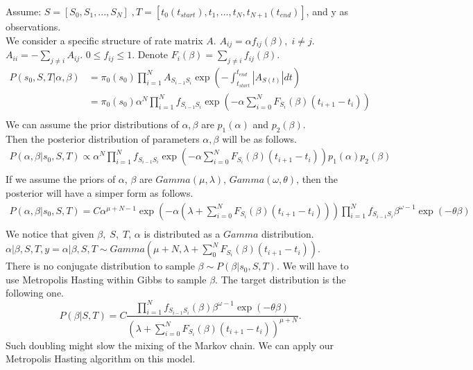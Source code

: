 \noindent Assume: $S = [S_0,S_1, ...,S_N] \;, T = [t_0(t_{start}), t_1,...,t_N, t_{N+1}(t_{end})]$, and y as observations.\\
We consider a specific structure of rate matrix $A$. $A_{ij} = \alpha f_{ij}(\beta), \; i \neq j$. $A_{ii} = -\sum_{j \neq i} A_{ij}$. $0 \leq f_{ij} \leq 1$. Denote $F_i(\beta) = \sum_{j \neq i} f_{ij}(\beta)$.\\
\begin{align*}
P(s_0, S, T | \alpha, \beta) &= \pi_0(s_0)\prod_{i = 1}^N A_{S_{i - 1}S_i} \exp(- \int_{t_{start}}^{t_{end}} |A_{S(t)}| dt)\\
&= \pi_0(s_0) \alpha^N \prod_{i = 1}^N f_{S_{i - 1}S_i} \exp(-\alpha  \sum_{i = 0}^{N} F_{S_i}(\beta)(t_{i + 1} - t_i))\\
\end{align*}
We can assume the prior distributions of $\alpha, \beta$ are $p_1(\alpha)$ and $p_2(\beta)$.\\
Then the posterior distribution of parameters $\alpha, \beta$ will be as follows.\\
\begin{align*}
P(\alpha, \beta | s_0, S, T ) \propto \alpha^N \prod_{i = 1}^N f_{S_{i - 1}S_i} \exp(-\alpha  \sum_{i = 0}^{N} F_{S_i}(\beta)(t_{i + 1} - t_i)) p_1(\alpha)p_2(\beta)\\
\end{align*}
If we assume the priors of $\alpha$, $\beta$ are $Gamma(\mu, \lambda)$, $Gamma(\omega, \theta)$, then the posterior will have a simper form as follows. 
\begin{align*}
P(\alpha, \beta | s_0, S, T ) = C \alpha^{\mu + N - 1}\exp(-\alpha (\lambda + \sum_{i = 0}^{N} F_{S_i}(\beta)(t_{i + 1} - t_i))) \prod_{i = 1}^N f_{S_{i - 1}S_i}  \beta ^{\omega - 1} \exp(-\theta \beta)\\
\end{align*}
We notice that given $\beta,\; S,\; T$, $\alpha$ is distributed as a $Gamma$ distribution.\\
$\alpha | \beta, S, T, y  = \alpha | \beta, S, T \sim Gamma(\mu + N, \lambda + \sum_{0}^NF_{S_i}(\beta)(t_{i + 1} - t_i))$.\\
There is no conjugate distribution to sample $\beta \sim P(\beta| s_0, S, T)$. We will have to use Metropolis Hasting within Gibbs to sample $\beta$. The target distribution is the following one.
$$ P(\beta | S, T) = C \frac{\prod_{i = 1}^N f_{S_{i -1}S_i}(\beta)\beta^{\omega - 1} \exp(-\theta \beta)}{(\lambda + \sum_{i = 0}^{N} F_{S_i}(\beta)(t_{i + 1} - t_i))^{\mu + N}}.$$
Such doubling might slow the mixing of the Markov chain. We can apply our Metropolis Hasting algorithm on this model.
